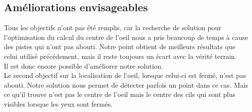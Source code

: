 \newpage

\subsection{Améliorations envisageables}
Tous les objectifs n'ont pas été remplis, car la recherche de solution pour l'optimisation du calcul du centre de l'oeil
nous a pris beaucoup de temps à cause des pistes qui n'ont pas abouti. Notre point obtient de meilleurs résultats
que celui utilisé précédement, mais il reste toujours un écart avec la vérité terrain. \\Il est donc encore possible
d'améliorer notre solution.\\

Le second objectif sur la localisation de l'oeil, lorsque celui-ci est fermé, n'est pas abouti. Notre solution
nous permet de détecter parfois un point dans ce cas. Mais ce qu'il trouve n'est pas le centre de l'oeil mais le
centre des cils qui sont plus visibles lorsque les yeux sont fermés.

